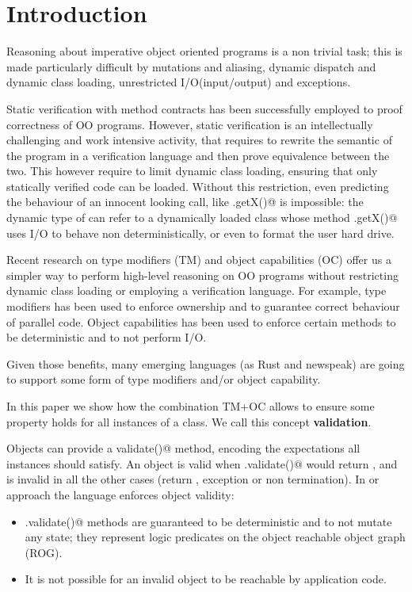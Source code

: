 
\section{Introduction}

Reasoning about imperative object oriented programs is a non trivial task;
this is made particularly difficult by mutations and aliasing, dynamic dispatch and dynamic class loading,
unrestricted I/O(input/output) and exceptions.

Static verification with method contracts has been successfully employed to proof correctness of OO programs.
However, static verification is an intellectually challenging and work intensive activity, that requires to rewrite the semantic of the program in a verification language and then prove equivalence between the two.
This however require to limit dynamic class loading, ensuring that only statically verified code can be loaded.
Without this restriction, even predicting the behaviour of an innocent looking call, like 
\Q@myPoint.getX()@ is impossible: the dynamic type of \Q@myPoint@ can refer to a dynamically loaded class
whose method \Q@.getX()@ uses I/O to behave non deterministically, or even to format the user hard drive.

Recent research on type modifiers (TM) and object capabilities (OC) offer us a simpler way to perform high-level reasoning on OO programs without restricting dynamic class loading or employing a verification language.
For example, type modifiers has been used to enforce ownership and to guarantee correct behaviour of
parallel code. Object capabilities has been used to enforce certain methods to be deterministic and to not perform I/O.

Given those benefits, many emerging languages (as Rust and newspeak)
are going to support some form of type modifiers and/or object capability.

In this paper we show how the combination TM+OC allows to ensure some property holds for all instances of a class. We call this concept \textbf{validation}.


Objects can provide a \Q@Bool validate()@ method, encoding the expectations
all instances should satisfy.
An object \Q@o@ is valid when \Q@o.validate()@ would return \Q@true@, and is invalid in all the other cases (return \Q@false@, exception or non termination).
In or approach the language enforces object validity:
\begin{itemize}
\item \Q@.validate()@ methods are guaranteed to be deterministic and to not mutate any state; they represent logic predicates on the object reachable object graph (ROG).
\item It is not possible for an invalid object to be reachable by application code.
\end{itemize}

